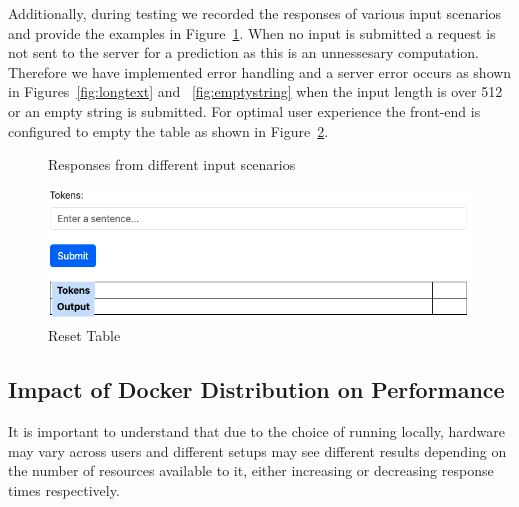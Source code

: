 \documentclass{surreydissertation}
\begin{document}
Additionally, during testing we recorded the responses of various input scenarios and provide the examples in Figure~\ref{fig:responses}. When no input is submitted a request is not sent to the server for a prediction as this is an unnessesary computation. Therefore we have implemented error handling and a server error occurs as shown in Figures~\ref{fig:longtext} and ~\ref{fig:emptystring} when the input length is over 512 or an empty string is submitted. For optimal user experience the front-end is configured to empty the table as shown in Figure~\ref{fig:reset}.

\begin{figure}[H]
    \centering
    \caption{Responses from different input scenarios}
    \label{fig:responses}
\end{figure}


\begin{figure}[H]
    \centering
    \includegraphics[width=0.6\linewidth]{Figures/emptyfrontend.png}
    \caption{Reset Table}
    \label{fig:reset}
 \end{figure}

\subsection{Impact of Docker Distribution on Performance}
It is important to understand that due to the choice of running locally, hardware may vary across users and different setups may see different results depending on the number of resources available to it, either increasing or decreasing response times respectively. 
\end{document}
